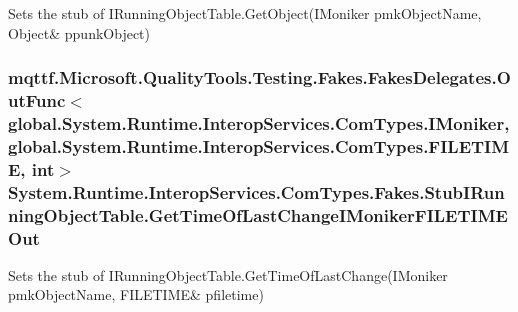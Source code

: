 Sets the stub of I\-Running\-Object\-Table.\-Get\-Object(I\-Moniker pmk\-Object\-Name, Object\& ppunk\-Object)

\hypertarget{class_system_1_1_runtime_1_1_interop_services_1_1_com_types_1_1_fakes_1_1_stub_i_running_object_table_af34c767d0909bb5c05389fbacfe521f9}{
\subsubsection[{Get\-Time\-Of\-Last\-Change\-I\-Moniker\-F\-I\-L\-E\-T\-I\-M\-E\-Out}]{\setlength{\rightskip}{0pt plus 5cm}mqttf.\-Microsoft.\-Quality\-Tools.\-Testing.\-Fakes.\-Fakes\-Delegates.\-Out\-Func$<$global.\-System.\-Runtime.\-Interop\-Services.\-Com\-Types.\-I\-Moniker, global.\-System.\-Runtime.\-Interop\-Services.\-Com\-Types.\-F\-I\-L\-E\-T\-I\-M\-E, int$>$ System.\-Runtime.\-Interop\-Services.\-Com\-Types.\-Fakes.\-Stub\-I\-Running\-Object\-Table.\-Get\-Time\-Of\-Last\-Change\-I\-Moniker\-F\-I\-L\-E\-T\-I\-M\-E\-Out}}\label{class_system_1_1_runtime_1_1_interop_services_1_1_com_types_1_1_fakes_1_1_stub_i_running_object_table_af34c767d0909bb5c05389fbacfe521f9}


Sets the stub of I\-Running\-Object\-Table.\-Get\-Time\-Of\-Last\-Change(I\-Moniker pmk\-Object\-Name, F\-I\-L\-E\-T\-I\-M\-E\& pfiletime)

